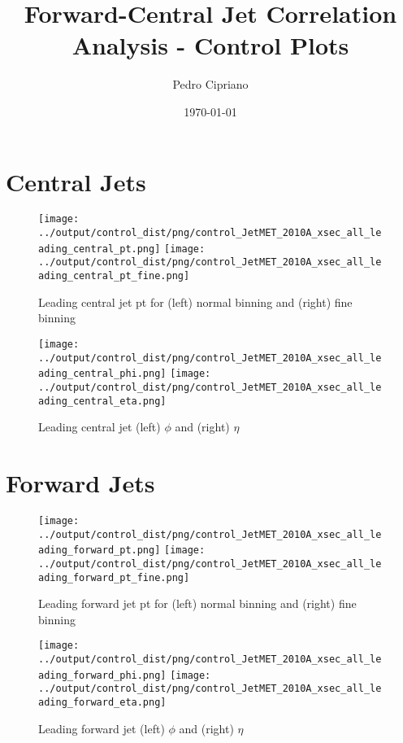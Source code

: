 \documentclass[11pt]{article}
\begin{document}
         
 
 \author{Pedro Cipriano}
 \date{\today}
 \title{Forward-Central Jet Correlation Analysis - Control Plots}

\maketitle

\section{Central Jets}

\begin{figure}[ht]
\centering
\texttt{[image: ../output/control\_dist/png/control\_JetMET\_2010A\_xsec\_all\_leading\_central\_pt.png]}
\texttt{[image: ../output/control\_dist/png/control\_JetMET\_2010A\_xsec\_all\_leading\_central\_pt\_fine.png]}
\caption{Leading central jet pt for (left) normal binning and (right) fine binning}
\label{fig:leading_central_pt}
\end{figure}

\begin{figure}[ht]
\centering
\texttt{[image: ../output/control\_dist/png/control\_JetMET\_2010A\_xsec\_all\_leading\_central\_phi.png]}
\texttt{[image: ../output/control\_dist/png/control\_JetMET\_2010A\_xsec\_all\_leading\_central\_eta.png]}
\caption{Leading central jet (left) $\phi$  and (right) $\eta$}
\label{fig:leading_central}
\end{figure}

\clearpage


\section{Forward Jets}

\begin{figure}[ht]
\centering
\texttt{[image: ../output/control\_dist/png/control\_JetMET\_2010A\_xsec\_all\_leading\_forward\_pt.png]}
\texttt{[image: ../output/control\_dist/png/control\_JetMET\_2010A\_xsec\_all\_leading\_forward\_pt\_fine.png]}
\caption{Leading forward jet pt for (left) normal binning and (right) fine binning}
\label{fig:leading_forward_pt}
\end{figure}


\begin{figure}[ht]
\centering
\texttt{[image: ../output/control\_dist/png/control\_JetMET\_2010A\_xsec\_all\_leading\_forward\_phi.png]}
\texttt{[image: ../output/control\_dist/png/control\_JetMET\_2010A\_xsec\_all\_leading\_forward\_eta.png]}
\caption{Leading forward jet (left) $\phi$  and (right) $\eta$}
\label{fig:leading_forward}
\end{figure}
\end{document}
